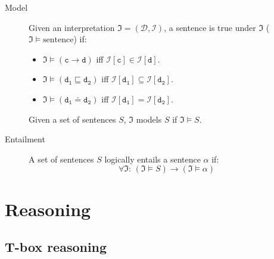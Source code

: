 \begin{description}
    \item[Model] 
        Given an interpretation $\mathfrak{I} = (\mathcal{D}, \mathcal{I})$,
        a sentence is true under $\mathfrak{I}$ ($\mathfrak{I} \models \text{sentence}$) if:
        \begin{itemize}
            \item $\mathfrak{I} \models (\texttt{c} \rightarrow \texttt{d})$ iff $\mathcal{I}[\texttt{c}] \in \mathcal{I}[\texttt{d}]$.
            \item $\mathfrak{I} \models (\texttt{d}_\texttt{1} \sqsubseteq \texttt{d}_\texttt{2})$ iff 
                $\mathcal{I}[\texttt{d}_\texttt{1}] \subseteq \mathcal{I}[\texttt{d}_\texttt{2}]$.
            \item $\mathfrak{I} \models (\texttt{d}_\texttt{1} \doteq \texttt{d}_\texttt{2})$ iff 
                $\mathcal{I}[\texttt{d}_\texttt{1}] = \mathcal{I}[\texttt{d}_\texttt{2}]$.
        \end{itemize}

        Given a set of sentences $S$, $\mathfrak{I}$ models $S$ if $\mathfrak{I} \models S$.

    \item[Entailment] 
        A set of sentences $S$ logically entails a sentence $\alpha$ if:
        \[ \forall \mathfrak{I}:\, (\mathfrak{I} \models S) \rightarrow (\mathfrak{I} \models \alpha) \]
\end{description}



\section{Reasoning}

\subsection{T-box reasoning}

